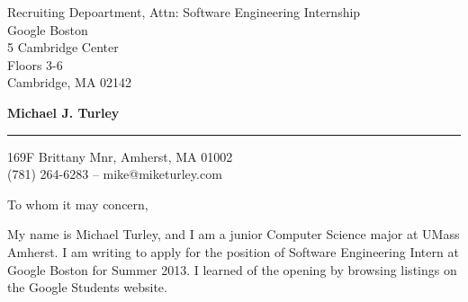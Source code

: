 \documentclass{letter} %
\begin{document}
\signature{Michael J. Turley}           %
\longindentation=0pt                       %
\let\raggedleft\raggedright                %
 
 
\begin{letter}{Recruiting Depoartment, Attn: Software Engineering Internship \\
Google Boston \\
5 Cambridge Center \\
Floors 3-6 \\
Cambridge, MA 02142}


\begin{flushleft}
{\LARGE\bf Michael J. Turley}
\end{flushleft}
\medskip\hrule height 1pt
\begin{flushright}
\hfill 169F Brittany Mnr, Amherst, MA 01002 \\
\hfill (781) 264-6283  --  mike@miketurley.com
\end{flushright} 
\vfill %

 
\opening{To whom it may concern,} 
 

\noindent My name is Michael Turley, and I am a junior Computer Science major at UMass Amherst.  I am writing to apply for the position of Software Engineering Intern at Google Boston for Summer 2013.  I learned of the opening by browsing listings on the Google Students website.
 


\end{letter}
\end{document}
